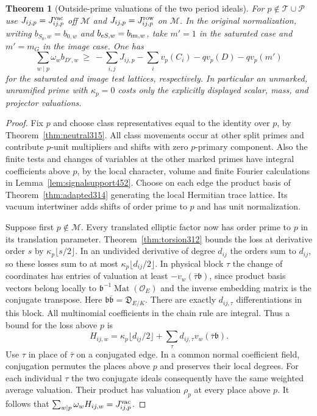 \documentclass[a4paper,11pt]{article}
\newtheorem{theorem}[proposition]{Theorem}
\theoremstyle{definition}
\theoremstyle{remark}
\numberwithin{equation}{section}
\begin{document}
\begin{theorem}[Outside-prime valuations of the two period ideals]\leavevmode
\label{thm:outsidedifferent453}
For \(p\notin\mathcal T\cup\mathcal P\) use
\(J_{ij,p}=J_{ij,p}^{\rm vac}\) off \(\mathcal M\)
and \(J_{ij,p}=J_{ij,p}^{\rm row}\) on \(\mathcal M\).
In the original normalization, writing \(b_{S_0,w}=b_{0,w}\)
and \(b_{eS,w}=b_{{\rm im},w}\), take \(m'=1\) in the saturated
case and \(m'=m_G\) in the image case. One has
\[
 \sum_{w\mid p}\omega_w b_{D',w}
 \ \ge\ -\sum_{i,j}J_{ij,p}-\sum_i v_p(C_i)-qv_p(D)
      -qv_p(m')
\]
for the saturated and image test lattices, respectively. In
particular an unmarked, unramified prime with \(\kappa_p=0\)
costs only the explicitly displayed scalar, mass, and projector
valuations.
\end{theorem}
\begin{proof}
Fix \(p\) and choose class representatives equal to the identity
over \(p\), by Theorem~\ref{thm:neutral315}. All class movements
occur at other split primes and contribute \(p\)-unit multipliers
and shifts with zero \(p\)-primary component. Also the finite
tests and changes of variables at the other marked primes have
integral coefficients above \(p\), by the local character,
volume and finite Fourier calculations in
Lemma~\ref{lem:signalsupport452}. Choose on each edge the product
basis of Theorem~\ref{thm:adapted314} generating the local
Hermitian trace lattice. Its vacuum intertwiner adds shifts of
order prime to \(p\) and has unit normalization.

Suppose first \(p\notin\mathcal M\). Every translated elliptic
factor now has order prime to \(p\) in its translation parameter.
Theorem~\ref{thm:torsion312} bounds the loss at derivative order
\(s\) by \(\kappa_p\lfloor s/2\rfloor\). In an undivided
derivative of degree \(d_{ij}\) the orders sum to \(d_{ij}\),
so these losses sum to at most
\(\kappa_p\lfloor d_{ij}/2\rfloor\). In physical block \(\tau\)
the change of coordinates has entries of valuation at least
\(-v_w(\bar\tau\mathfrak b)\), since product basis vectors
belong locally to \(\mathfrak b^{-1}\operatorname{Mat}(\mathcal O_E)\)
and the inverse embedding matrix is the conjugate transpose.
Here \(\mathfrak b\overline{\mathfrak b}=\mathfrak D_{E/K}\).
There are exactly \(d_{ij,\tau}\) differentiations in this block.
All multinomial coefficients in the chain rule are integral.
Thus a bound for the loss above \(p\) is
\[
 H_{ij,w}=\kappa_p\lfloor d_{ij}/2\rfloor+
                \sum_\tau d_{ij,\tau}v_w(\bar\tau\mathfrak b).
\]
Use \(\tau\) in place of \(\bar\tau\) on a conjugated edge.
In a common normal coefficient field, conjugation permutes
the places above \(p\) and preserves their local degrees. For
each individual \(\tau\) the two conjugate ideals consequently
have the same weighted average valuation. Their product has
valuation \(\rho_p\) at every place above \(p\).
It follows that \(\sum_{w\mid p}\omega_w H_{ij,w}=J_{ij,p}^{\rm vac}\).


\end{proof}
\end{document}
